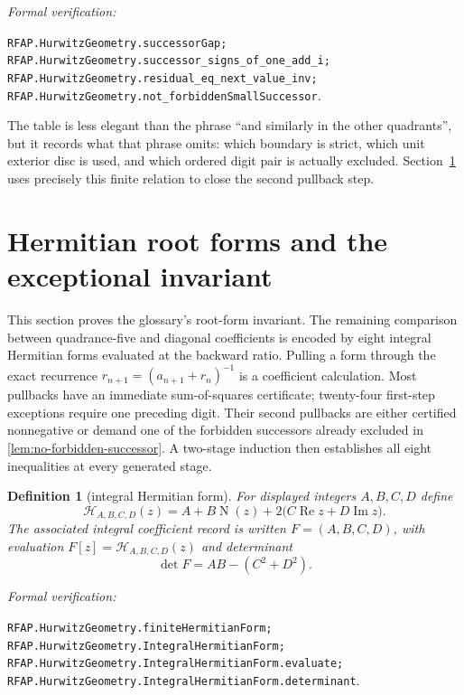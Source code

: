 \documentclass[11pt]{article}
\newtheorem{definition}[definition]{Definition}
\newcommand{\Norm}[1]{\operatorname{N}\!\left(#1\right)}
\newcommand{\leanref}[1]{\par\smallskip\noindent
  \emph{Formal verification:}\par\nobreak
  {\raggedright\nolinkurl{#1}.\par}}
\begin{document}
\leanref{RFAP.HurwitzGeometry.successorGap;
RFAP.HurwitzGeometry.successor_signs_of_one_add_i;
RFAP.HurwitzGeometry.residual_eq_next_value_inv;
RFAP.HurwitzGeometry.not_forbiddenSmallSuccessor}

The table is less elegant than the phrase ``and similarly in the other
quadrants'', but it records what that phrase omits: which boundary is strict,
which unit exterior disc is used, and which ordered digit pair is actually
excluded.  Section~\ref{sec:hermitian-invariant} uses precisely this finite
relation to close the second pullback step.

\section{Hermitian root forms and the exceptional invariant}
\label{sec:hermitian-invariant}

This section proves the glossary's root-form invariant.  The remaining
comparison between quadrance-five and diagonal coefficients is encoded by eight integral
Hermitian forms evaluated at the backward ratio.  Pulling a form through the
exact recurrence $r_{n+1}=(a_{n+1}+r_n)^{-1}$ is a coefficient calculation.
Most pullbacks have an immediate sum-of-squares certificate; twenty-four
first-step exceptions require one preceding digit.  Their second pullbacks
are either certified nonnegative or demand one of the forbidden successors
already excluded in \cref{lem:no-forbidden-successor}.  A two-stage induction
then establishes all eight inequalities at every generated stage.

\begin{definition}[integral Hermitian form]
\label{def:integral-hermitian-form}
For displayed integers $A,B,C,D$ define
\begin{equation}
\label{eq:integral-hermitian-form}
 \mathcal H_{A,B,C,D}(z)
   =A+B\Norm z+2\bigl(C\operatorname{Re}z+D\operatorname{Im}z\bigr).
\end{equation}
The associated integral coefficient record is written $F=(A,B,C,D)$, with
evaluation $F[z]=\mathcal H_{A,B,C,D}(z)$ and determinant
\begin{equation}
\label{eq:hermitian-determinant}
                             \det F=AB-(C^2+D^2).
\end{equation}
\end{definition}

\leanref{RFAP.HurwitzGeometry.finiteHermitianForm;
RFAP.HurwitzGeometry.IntegralHermitianForm;
RFAP.HurwitzGeometry.IntegralHermitianForm.evaluate;
RFAP.HurwitzGeometry.IntegralHermitianForm.determinant}
\end{document}
